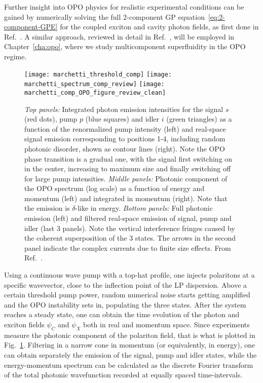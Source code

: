 Further insight into OPO physics for realistic experimental conditions
can be gained by numerically solving the full 2-component GP
equation~\eqref{eq:2-component-GPE} for the coupled exciton and cavity
photon fields, as first done in Ref.~\cite{Whittaker_2005_c}.  A
similar approach, reviewed in detail in Ref.~\cite{9783642241857},
will be employed in Chapter~\ref{cha:opo}, where we study
multicomponent superfluidity in the OPO regime.
%
\begin{figure}[tb]\centering
  \texttt{[image: marchetti\_threshold\_comp]}
  \texttt{[image: marchetti\_spectrum\_comp\_review]}
  \texttt{[image: marchetti\_comp\_OPO\_figure\_review\_clean]}
  \caption{
    \emph{Top panels:} Integrated photon emission intensities for the signal $s$ (red dots), pump $p$ (blue squares) and idler $i$ (green triangles) as a function of the renormalized pump intensity (left) and real-space signal emission corresponding to positions 1-4, including random photonic disorder, shown as contour lines (right). Note the OPO phase transition is a gradual one, with the signal first switching on in the center, increasing to maximum size and finally switching off for large pump intensities.
    \emph{Middle panels:} Photonic component of the OPO spectrum (log scale) as a function of energy and momentum (left) and integrated in momentum (right). Note that the emission is $\delta$-like in energy.
    \emph{Bottom panels:} Full photonic emission (left) and filtered real-space emission of signal, pump and idler (last 3 panels). Note the vertical interference fringes caused by the coherent superposition of the 3 states. The arrows in the second panel indicate the complex currents due to  finite size effects.
    From Ref.~\cite{9783642241857}.
  }\label{fig:marchetti}
\end{figure}
%
Using a continuous wave pump with a top-hat profile, one injects
polaritons at a specific wavevector, close to the inflection point of
the LP dispersion. Above a certain threshold pump power, random
numerical noise starts getting amplified and the OPO instability sets
in, populating the three states. After the system reaches a steady
state, one can obtain the time evolution of the photon and exciton
fields $\psi_C$ and $\psi_X$ both in real and momentum space. Since
experiments measure the photonic component of the polariton field,
that is what is plotted in Fig.~\ref{fig:marchetti}. Filtering in a
narrow cone in momentum (or equivalently, in energy), one can obtain
separately the emission of the signal, pump and idler states, while
the energy-momentum spectrum can be calculated as the discrete Fourier
transform of the total photonic wavefunction recorded at equally
spaced time-intervals.

